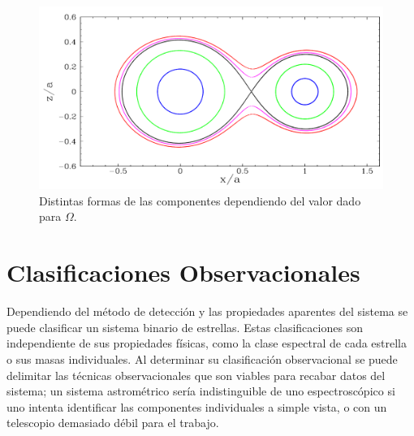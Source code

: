 \begin{figure}[!ht]
	\centering
	\includegraphics[scale=0.4]{Introduccion/Figures/Figura Forma Roche_PHOEBE Reference.png}
	\caption{Distintas formas de las componentes dependiendo del valor dado para $\Omega$.}
	\label{figuraRocheFormaPhoebe}
\end{figure}

\section{Clasificaciones Observacionales}

Dependiendo del método de detección y las propiedades aparentes del sistema se
puede clasificar un sistema binario de estrellas. Estas clasificaciones son
independiente de sus propiedades físicas, como la clase espectral de cada
estrella o sus masas individuales. Al determinar su clasificación observacional
se puede delimitar las técnicas observacionales que son viables para recabar
datos del sistema; un sistema astrométrico sería indistinguible de uno
espectroscópico si uno intenta identificar las componentes individuales a simple
vista, o con un telescopio demasiado débil para el trabajo.

